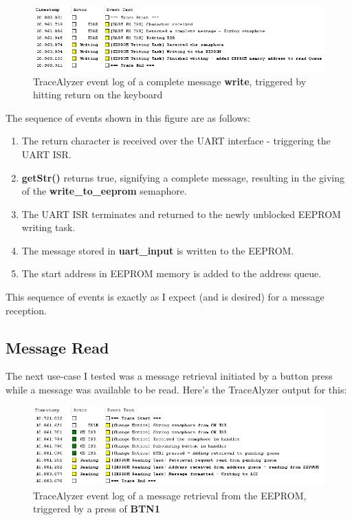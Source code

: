 \documentclass[a4paper, 12pt]{article}
\begin{document}
\begin{figure}[H]
\centering
\includegraphics[width=\textwidth]{message-write.PNG}
\caption{TraceAlyzer event log of a complete message \textbf{write}, triggered by hitting return on the keyboard}
\label{fig:message-write}
\end{figure}

The sequence of events shown in this figure are as follows:

\begin{enumerate}
\item The return character is received over the UART interface - triggering the UART ISR.
\item \textbf{getStr()} returns true, signifying a complete message, resulting in the giving of the \textbf{write\_to\_eeprom} semaphore.
\item The UART ISR terminates and returned to the newly unblocked EEPROM writing task.
\item The message stored in \textbf{uart\_input} is written to the EEPROM.
\item The start address in EEPROM memory is added to the address queue.
\end{enumerate}

This sequence of events is exactly as I expect (and is desired) for a message reception.

\subsection{Message Read}
The next use-case I tested was a message retrieval initiated by a button press while a message was available to be read. Here's the TraceAlyzer output for this:

\begin{figure}[H]
\centering
\includegraphics[width=\textwidth]{button-press.PNG}
\caption{TraceAlyzer event log of a message retrieval from the EEPROM, triggered by a press of \textbf{BTN1}}
\label{fig:button-press}
\end{figure}
\end{document}
